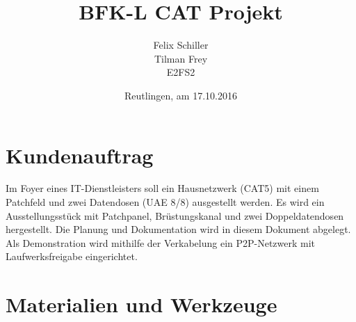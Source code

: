 \documentclass[
a4paper,     %
 headsepline, %
11pt         %
]{scrartcl}  %
\title{BFK-L CAT Projekt}
\author{Felix Schiller \\ Tilman Frey \\ E2FS2}
\date{Reutlingen, am 17.10.2016}
\begin{document}

\maketitle

\newpage
\tableofcontents





\section{Kundenauftrag}
Im Foyer eines IT-Dienstleisters soll ein Hausnetzwerk (CAT5) mit einem Patchfeld und zwei Datendosen (UAE 8/8) ausgestellt werden.  
Es wird ein Ausstellungsstück mit Patchpanel, Brüstungskanal und zwei Doppeldatendosen hergestellt. 
Die Planung und Dokumentation wird in diesem Dokument abgelegt.
Als Demonstration wird mithilfe der Verkabelung ein P2P-Netzwerk mit Laufwerksfreigabe eingerichtet.


\section{Materialien und Werkzeuge}
\end{document}
